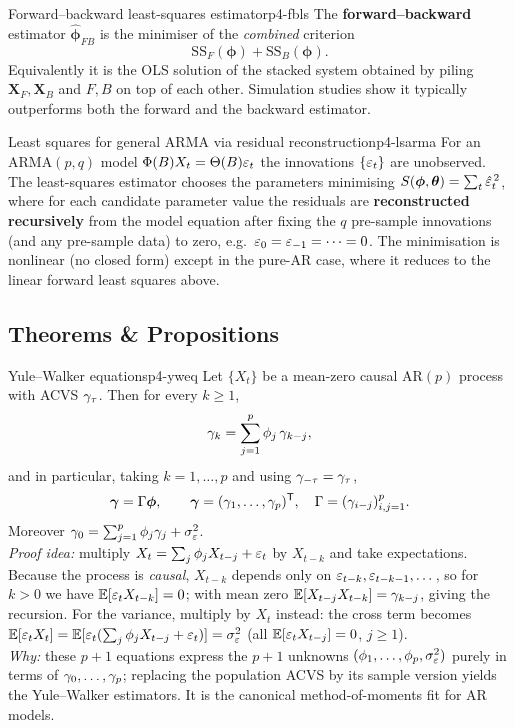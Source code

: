 \begin{definition}{Forward--backward least-squares estimator}{p4-fbls}
The \textbf{forward--backward} estimator $\hat{\boldsymbol\phi}_{FB}$ is the
minimiser of the \emph{combined} criterion
\[
\mathrm{SS}_F(\boldsymbol\phi)+\mathrm{SS}_B(\boldsymbol\phi).
\]
Equivalently it is the OLS solution of the stacked system obtained by piling
$\mathbf X_F,\mathbf X_B$ and $F,B$ on top of each other. Simulation studies
show it typically outperforms both the forward and the backward estimator.
\end{definition}

\begin{definition}{Least squares for general ARMA via residual reconstruction}{p4-lsarma}
For an ARMA$(p,q)$ model $\Phi(B)X_t=\Theta(B)\varepsilon_t$ the innovations
$\{\varepsilon_t\}$ are unobserved. The least-squares estimator chooses the parameters
minimising $S(\boldsymbol\phi,\boldsymbol\theta)=\sum_t\hat{\varepsilon}_t^{\,2}$, where
for each candidate parameter value the residuals are \textbf{reconstructed
recursively} from the model equation after fixing the $q$ pre-sample
innovations (and any pre-sample data) to zero, e.g.\
$\varepsilon_0=\varepsilon_{-1}=\cdots=0$. The minimisation is nonlinear (no closed form)
except in the pure-AR case, where it reduces to the linear forward least squares
above.
\end{definition}

\subsection{Theorems \& Propositions}

\begin{proposition}{Yule--Walker equations}{p4-yweq}
Let $\{X_t\}$ be a mean-zero causal AR$(p)$ process with ACVS $\gamma_\tau$.
Then for every $k\ge1$,
\[
\gamma_k=\sum_{j=1}^p\phi_j\,\gamma_{k-j},
\]
and in particular, taking $k=1,\dots,p$ and using $\gamma_{-\tau}=\gamma_\tau$,
\[
\boldsymbol{\gamma}=\Gamma\boldsymbol\phi,
\qquad
\boldsymbol{\gamma}=(\gamma_1,\dots,\gamma_p)^{\mathsf{T}},\quad
\Gamma=(\gamma_{i-j})_{i,j=1}^p .
\]
Moreover $\gamma_0=\sum_{j=1}^p\phi_j\gamma_j+\sigma_\varepsilon^2$.\\[2pt]
\textit{Proof idea:} multiply $X_t=\sum_j\phi_jX_{t-j}+\varepsilon_t$ by $X_{t-k}$ and
take expectations. Because the process is \emph{causal}, $X_{t-k}$ depends only
on $\varepsilon_{t-k},\varepsilon_{t-k-1},\dots$, so for $k>0$ we have $\mathbb{E}[\varepsilon_tX_{t-k}]=0$;
with mean zero $\mathbb{E}[X_{t-j}X_{t-k}]=\gamma_{k-j}$, giving the recursion. For the
variance, multiply by $X_t$ instead: the cross term becomes
$\mathbb{E}[\varepsilon_tX_t]=\mathbb{E}[\varepsilon_t(\sum_j\phi_jX_{t-j}+\varepsilon_t)]=\sigma_\varepsilon^2$ (all
$\mathbb{E}[\varepsilon_tX_{t-j}]=0$, $j\ge1$).\\
\textit{Why:} these $p+1$ equations express the $p+1$ unknowns
$(\phi_1,\dots,\phi_p,\sigma_\varepsilon^2)$ purely in terms of $\gamma_0,\dots,\gamma_p$;
replacing the population ACVS by its sample version yields the Yule--Walker
estimators. It is the canonical method-of-moments fit for AR models.
\end{proposition}

